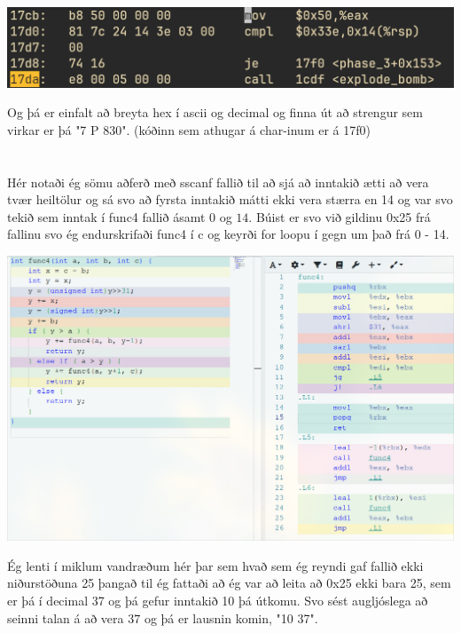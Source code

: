 \documentclass{article}
\begin{document}
	\begin{center}
		\includegraphics[scale=0.35]{jmp.png}
	\end{center}

	Og þá er einfalt að breyta hex í ascii og decimal og finna út að strengur sem 
	virkar er þá "7 P 830". (kóðinn sem athugar á char-inum er á 17f0)

	\section{}
	Hér notaði ég sömu aðferð með sscanf fallið til að sjá að inntakið ætti 
	að vera tvær heiltölur og sá svo að fyrsta inntakið mátti ekki vera 
	stærra en 14 og var svo tekið sem inntak í func4 fallið ásamt $0$ og 
	$14$. Búist er svo við gildinu 0x25 frá fallinu svo ég endurskrifaði 
	func4 í c og keyrði for loopu í gegn um það frá 0 - 14. 
	\begin{center}
		\includegraphics[scale=0.28]{func4.png}
	\end{center}
	Ég lenti í miklum vandræðum hér þar sem hvað sem ég reyndi gaf fallið ekki 
	niðurstöðuna 25 þangað til ég fattaði að ég var að leita að 0x25 ekki 
	bara 25, sem er þá í decimal 37 og þá gefur inntakið 10 þá útkomu. Svo 
	sést augljóslega að seinni talan á að vera $37$ og þá er lausnin komin, 
	"10 37".
\end{document}
